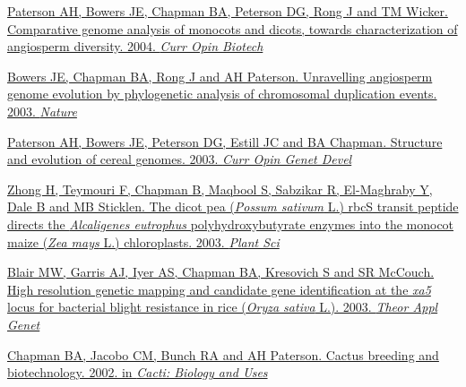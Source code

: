 \documentclass[10pt]{article}
\makeatletter
\newlength{\bibhang}
\newlength{\bibsep}
 {\@listi \global\bibsep\itemsep \global\advance\bibsep by\parsep}
\newenvironment{bibsection}%
        {\vspace{-\baselineskip}\begin{list}{}{%
       \setlength{\leftmargin}{\bibhang}%
       \setlength{\itemindent}{-\leftmargin}%
       \setlength{\itemsep}{\bibsep}%
       \setlength{\parsep}{\z@}%
        \setlength{\partopsep}{0pt}%
        \setlength{\topsep}{0pt}}}
        {\end{list}\vspace{-.6\baselineskip}}
\renewcommand{\section}[2]%
        {\pagebreak[2]\vspace{1.3\baselineskip}%
         \phantomsection\addcontentsline{toc}{section}{#1}%
         \hspace{0in}%
         \marginpar{
         \raggedright \scshape #1}#2}
\newenvironment{outerlist}[1][\enskip\textbullet]%
        {\begin{itemize}[#1]}{\end{itemize}%
         \vspace{-.6\baselineskip}}
\providecommand*\email[1]{\href{mailto:#1}{#1}}
\makeatother
\begin{document}
\begin{bibsection}
  \item \href{http://linkinghub.elsevier.com/retrieve/pii/S0958166904000308}
    {Paterson AH, Bowers JE, Chapman BA, Peterson DG, Rong J and TM Wicker. 
    Comparative genome analysis of monocots and dicots, towards characterization 
    of angiosperm diversity. 2004. \textit{Curr Opin Biotech}}

  \item \href{http://www.nature.com/nature/journal/v422/n6930/full/nature01521.html}
    {Bowers JE, Chapman BA, Rong J and AH Paterson. 
    Unravelling angiosperm genome evolution by phylogenetic analysis of
    chromosomal duplication events. 2003. \textit{Nature}}

  \item \href{http://linkinghub.elsevier.com/retrieve/pii/S0959437X03001400}
    {Paterson AH, Bowers JE, Peterson DG, Estill JC and BA Chapman.
    Structure and evolution of cereal genomes. 2003. \textit{Curr Opin Genet Devel}}

  \item \href{http://linkinghub.elsevier.com/retrieve/pii/S016894520300061X}
    {Zhong H, Teymouri F, Chapman B, Maqbool S, Sabzikar R, El-Maghraby Y, 
    Dale B and MB Sticklen.
    The dicot pea (\textit{Possum sativum} L.) rbcS transit peptide directs the
    \textit{Alcaligenes eutrophus} polyhydroxybutyrate enzymes into
    the monocot maize (\textit{Zea mays} L.) chloroplasts. 2003.
    \textit{Plant Sci}}

  \item \href{http://dx.doi.org/10.1007/s00122-003-1231-2}
    {Blair MW, Garris AJ, Iyer AS, Chapman BA, Kresovich S and SR McCouch.
    High resolution genetic mapping and candidate gene identification 
    at the \textit{xa5} locus for bacterial blight 
    resistance in rice (\textit{Oryza sativa} L.). 2003. \textit{Theor Appl Genet}}
  
  \item \href{http://www.ucpress.edu/book.php?isbn=9780520231573}
    {Chapman BA, Jacobo CM, Bunch RA and AH Paterson. 
    Cactus breeding and biotechnology. 2002. 
    in \textit{Cacti: Biology and Uses}}
\end{bibsection}

\end{document}
